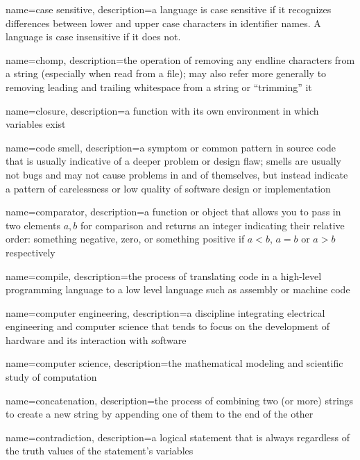{
  name=case sensitive,
  description={a language is case sensitive if it recognizes differences between lower and upper case characters in 
  	identifier names.  A language is case insensitive if it does not.}
}

{
  name=chomp,
  description={the operation of removing any endline characters from a string (especially when read from a file); may also refer more generally to removing leading and trailing whitespace from a string or ``trimming'' it}
}

{
  name=closure,
  description={a function with its own environment in which variables exist}
}

{
  name=code smell,
  description={a symptom or common pattern in source code that is usually indicative of a deeper problem or design flaw; smells are usually not bugs and may not cause problems in and of themselves, but instead indicate a pattern of carelessness or low quality of software design or implementation}
}

{
  name=comparator,
  description={a function or object that allows you to pass in two elements $a, b$ for comparison and returns an integer indicating their relative order: something negative, zero, or something positive if $a < b$, $a = b$ or $a > b$ respectively}
}

{
  name=compile,
  description={the process of translating code in a high-level programming language to a low level language such as assembly or machine code}
}

{
  name=computer engineering,
  description={a discipline integrating electrical engineering and computer science that tends to focus on the development of hardware and its interaction with software}
}

{
  name=computer science,
  description={the mathematical modeling and scientific study of computation}
}

{
  name=concatenation,
  description={the process of combining two (or more) strings to create a new string by appending one of them to the end of the other}
}

{
  name=contradiction,
  description={a logical statement that is always \False regardless of the truth values of the statement's variables}
}

